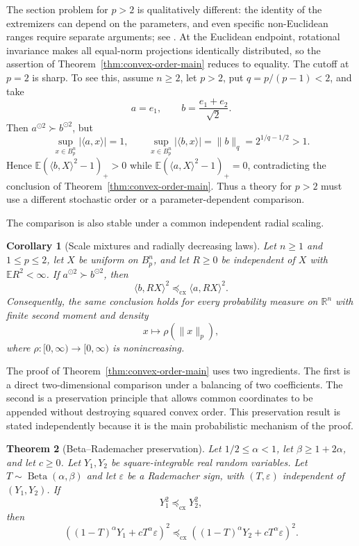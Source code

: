 \documentclass[pdflatex,sn-mathphys-num]{sn-jnl}
\numberwithin{equation}{section}
\theoremstyle{thmstyleone}
\newtheorem{theorem}{Theorem}[section]
\newtheorem{corollary}[theorem]{Corollary}
\theoremstyle{thmstylethree}
\newcommand{\R}{\mathbb{R}}
\newcommand{\E}{\mathbb{E}}
\newcommand{\1}{\mathbf{1}}
\newcommand{\eps}{\varepsilon}
\newcommand{\cx}{\preceq_{\mathrm{cx}}}
\newcommand{\sqvec}[1]{#1^{\odot 2}}
\begin{document}
The section problem for $p>2$ is qualitatively different: the
identity of the extremizers can depend on the parameters, and even
specific non-Euclidean ranges require separate arguments; see
\cite{EskenazisNayarTkoczResilience}. At the Euclidean endpoint,
rotational invariance makes all equal-norm projections identically
distributed, so the assertion of
Theorem~\ref{thm:convex-order-main} reduces to equality. The cutoff at $p=2$ is sharp. To see this, assume $n\ge2$, let
$p>2$, put $q=p/(p-1)<2$, and take
\[
 a=e_1,
 \qquad
 b=\frac{e_1+e_2}{\sqrt2}.
\]
Then $\sqvec a\succ\sqvec b$, but
\[
 \sup_{x\in B_p^n}|\langle a,x\rangle|=1,
 \qquad
 \sup_{x\in B_p^n}|\langle b,x\rangle|
 =\|b\|_q=2^{1/q-1/2}>1.
\]
Hence
$\E(\langle b,X\rangle^2-1)_+>0$ while
$\E(\langle a,X\rangle^2-1)_+=0$, contradicting the conclusion of
Theorem~\ref{thm:convex-order-main}. Thus a theory for $p>2$ must use a
different stochastic order or a parameter-dependent comparison.

The comparison is also stable under a common independent radial scaling.

\begin{corollary}[Scale mixtures and radially decreasing laws]\label{cor:radial-intro}
Let $n\ge1$ and $1\le p\le2$, let $X$ be uniform on $B_p^n$, and let
$R\ge0$ be
independent of $X$ with $\E R^2<\infty$. If $\sqvec a\succ\sqvec b$, then
\[
 \langle b,RX\rangle^2\cx\langle a,RX\rangle^2.
\]
Consequently, the same conclusion holds for every probability measure
on $\R^n$ with finite second moment and density
\[
 x\longmapsto \rho(\|x\|_p),
\]
where $\rho:[0,\infty)\to[0,\infty)$ is nonincreasing.
\end{corollary}

The proof of Theorem~\ref{thm:convex-order-main} uses two ingredients.
The first is a direct two-dimensional comparison under a balancing of
two coefficients. The second is a preservation principle that allows
common coordinates to be appended without destroying squared convex
order. This preservation result is stated independently because it is
the main probabilistic mechanism of the proof.

\begin{theorem}[Beta--Rademacher preservation]\label{thm:app-append}
Let $1/2\le\alpha<1$, let $\beta\ge1+2\alpha$, and let $c\ge0$. Let
$Y_1,Y_2$ be square-integrable real random variables. Let
$T\sim\operatorname{Beta}(\alpha,\beta)$ and let $\eps$ be a Rademacher
sign, with $(T,\eps)$ independent of $(Y_1,Y_2)$. If
\[
 Y_1^2\cx Y_2^2,
\]
then
\[
 \left((1-T)^\alpha Y_1+cT^\alpha\eps\right)^2
 \cx
 \left((1-T)^\alpha Y_2+cT^\alpha\eps\right)^2.
\]
\end{theorem}
\end{document}
